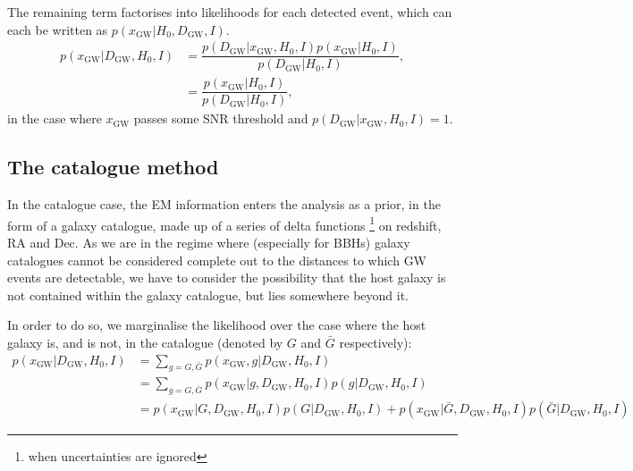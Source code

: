 \documentclass[a4paper,10pt]{article}
\begin{document}
The remaining term factorises into likelihoods for each detected event,
which can each be written as $p(x_{\text{GW}}|H_0,D_{\text{GW}},I)$.
\begin{equation}
\label{Eq.xD}
\begin{aligned}
p(x_{\text{GW}}|D_{\text{GW}},H_0,I) &= \dfrac{p(D_{\text{GW}}|x_{\text{GW}},H_0,I)p(x_{\text{GW}}|H_0,I)}{p(D_{\text{GW}}|H_0,I)},
\\ &= \dfrac{p(x_{\text{GW}}|H_0,I)}{p(D_{\text{GW}}|H_0,I)},
\end{aligned} 
\end{equation}
in the case where $x_{\text{GW}}$ passes some SNR threshold and $p(D_{\text{GW}}|x_{\text{GW}},H_0,I)=1$.

\subsection{The catalogue method}
In the catalogue case, the EM information enters the analysis as a prior, in the form of a galaxy catalogue, made up of a series of delta functions \footnote{when uncertainties are ignored} on redshift, RA and Dec.  As we are in the regime where (especially for BBHs) galaxy catalogues cannot be considered complete out to the distances to which GW events are detectable, we have to consider the possibility that the host galaxy is not contained within the galaxy catalogue, but lies somewhere beyond it.

In order to do so, we marginalise the likelihood over the case where the host galaxy is, and is not, in the catalogue (denoted by $G$ and $\bar{G}$ respectively):
\begin{equation} \label{Eq:sum G}
\begin{aligned}
p(x_{\text{GW}}|D_{\text{GW}},H_0,I) &= \sum_{g=G,\bar{G}} p(x_{\text{GW}},g|D_{\text{GW}},H_0,I)
\\ &= \sum_{g=G,\bar{G}} p(x_{\text{GW}}|g,D_{\text{GW}},H_0,I) p(g|D_{\text{GW}},H_0,I)
\\ &= p(x_{\text{GW}}|G,D_{\text{GW}},H_0,I) p(G|D_{\text{GW}},H_0,I) + p(x_{\text{GW}}|\bar{G},D_{\text{GW}},H_0,I) p(\bar{G}|D_{\text{GW}},H_0,I)
\end{aligned} 
\end{equation}
\end{document}
